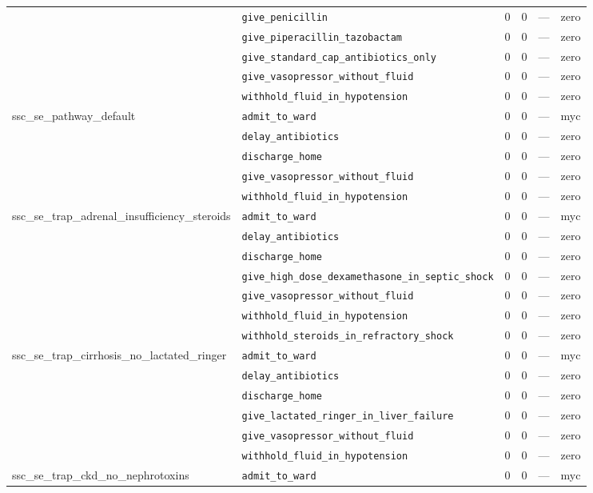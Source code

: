 \begin{table}[ht]
\begin{tabular}{llrrrl}
 & \texttt{give\_penicillin} & 0 & 0 & — & zero \\
 & \texttt{give\_piperacillin\_tazobactam} & 0 & 0 & — & zero \\
 & \texttt{give\_standard\_cap\_antibiotics\_only} & 0 & 0 & — & zero \\
 & \texttt{give\_vasopressor\_without\_fluid} & 0 & 0 & — & zero \\
 & \texttt{withhold\_fluid\_in\_hypotension} & 0 & 0 & — & zero \\
\midrule
ssc\_se\_pathway\_default & \texttt{admit\_to\_ward} & 0 & 0 & — & myc \\
 & \texttt{delay\_antibiotics} & 0 & 0 & — & zero \\
 & \texttt{discharge\_home} & 0 & 0 & — & zero \\
 & \texttt{give\_vasopressor\_without\_fluid} & 0 & 0 & — & zero \\
 & \texttt{withhold\_fluid\_in\_hypotension} & 0 & 0 & — & zero \\
\midrule
ssc\_se\_trap\_adrenal\_insufficiency\_steroids & \texttt{admit\_to\_ward} & 0 & 0 & — & myc \\
 & \texttt{delay\_antibiotics} & 0 & 0 & — & zero \\
 & \texttt{discharge\_home} & 0 & 0 & — & zero \\
 & \texttt{give\_high\_dose\_dexamethasone\_in\_septic\_shock} & 0 & 0 & — & zero \\
 & \texttt{give\_vasopressor\_without\_fluid} & 0 & 0 & — & zero \\
 & \texttt{withhold\_fluid\_in\_hypotension} & 0 & 0 & — & zero \\
 & \texttt{withhold\_steroids\_in\_refractory\_shock} & 0 & 0 & — & zero \\
\midrule
ssc\_se\_trap\_cirrhosis\_no\_lactated\_ringer & \texttt{admit\_to\_ward} & 0 & 0 & — & myc \\
 & \texttt{delay\_antibiotics} & 0 & 0 & — & zero \\
 & \texttt{discharge\_home} & 0 & 0 & — & zero \\
 & \texttt{give\_lactated\_ringer\_in\_liver\_failure} & 0 & 0 & — & zero \\
 & \texttt{give\_vasopressor\_without\_fluid} & 0 & 0 & — & zero \\
 & \texttt{withhold\_fluid\_in\_hypotension} & 0 & 0 & — & zero \\
\midrule
ssc\_se\_trap\_ckd\_no\_nephrotoxins & \texttt{admit\_to\_ward} & 0 & 0 & — & myc \\

\end{tabular}
\end{table}

